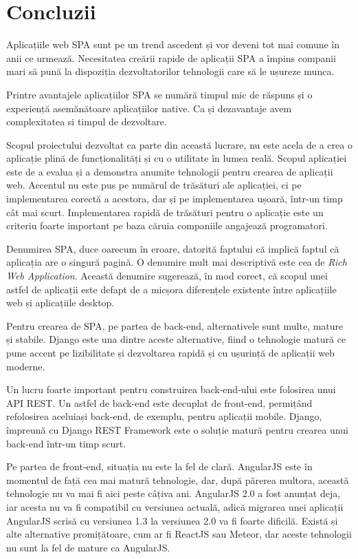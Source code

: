 \chapter{Concluzii}

Aplicațiile web SPA sunt pe un trend ascedent și vor deveni tot mai
comune în anii ce urmează. Necesitatea creării rapide de aplicații SPA
a împins companii mari să pună la dispoziția dezvoltatorilor
tehnologii care să le ușureze munca.

Printre avantajele aplicațiilor SPA se numără timpul mic de 
răspuns și o experiență asemănătoare aplicațiilor native.
Ca și dezavantaje avem complexitatea si timpul de dezvoltare.

Scopul proiectului dezvoltat ca parte din această lucrare,
nu este acela de a crea o aplicație plină de funcționalități
și cu o utilitate în lumea reală. Scopul aplicației este
de a evalua și a demonstra anumite tehnologii pentru
crearea de aplicații web. Accentul nu este pus pe
numărul de trăsături ale aplicației, ci pe implementarea corectă
a acestora, dar și pe implementarea ușoară, într-un timp cât mai
scurt. Implementarea rapidă de trăsături pentru o aplicație
este un criteriu foarte important pe baza căruia companiile
angajează programatori.

Denumirea SPA, duce oarecum în eroare, datorită faptului
că implică faptul că aplicația are o singură pagină.
O denumire mult mai descriptivă este cea de 
\emph{Rich Web Application}. Această denumire sugerează,
în mod corect, că scopul unei astfel de aplicații este
defapt de a micșora diferențele existente între aplicațiile
web și aplicațiile desktop.

Pentru crearea de SPA, pe partea de back-end, 
alternativele sunt multe, mature și stabile.
Django este una dintre aceste alternative, fiind o tehnologie
matură ce pune accent pe lizibilitate și dezvoltarea rapidă și 
cu ușurință de aplicații web moderne.

Un lucru foarte important pentru construirea back-end-ului este
folosirea unui API REST. Un astfel de back-end este decuplat
de front-end, permițând refolosirea aceluiași back-end, de exemplu, pentru
aplicații mobile. Django, împreună cu Django REST Framework este
o soluție matură pentru crearea unui back-end într-un timp
scurt.

Pe partea de front-end, situația nu este la fel de clară. AngularJS este
în momentul de față cea mai matură tehnologie, dar, după părerea multora,
această tehnologie nu va mai fi aici peste câțiva ani.
AngularJS 2.0 a fost anunțat deja, iar acesta nu va fi compatibil
cu versiunea actuală, adică migrarea unei aplicații AngularJS scrisă
cu versiunea 1.3 la versiunea 2.0 va fi foarte dificilă. Există și alte
alternative promițătoare, cum ar fi ReactJS sau Meteor, 
dar aceste tehnologii nu sunt la fel de mature ca AngularJS.

